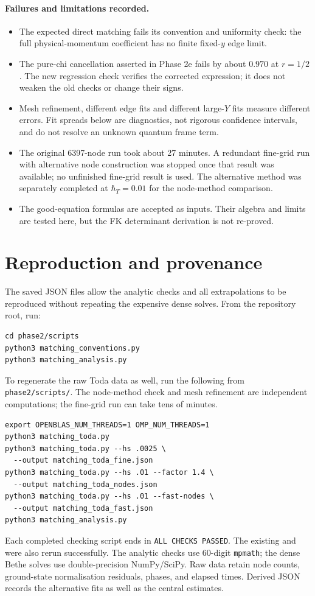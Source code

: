 \documentclass[11pt,a4paper]{article}
\begin{document}
\paragraph{Failures and limitations recorded.}
\begin{itemize}
\item The expected direct matching fails its convention and uniformity check:
the full physical-momentum coefficient has no finite fixed-$y$ edge limit.
\item The pure-chi cancellation asserted in Phase 2e fails by about $0.970$
at $r=1/2$. The new regression check verifies the corrected expression;
it does not weaken the old checks or change their signs.
\item Mesh refinement, different edge fits and different large-$Y$ fits
measure different errors. Fit spreads below are diagnostics, not rigorous
confidence intervals, and do not resolve an unknown quantum frame term.
\item The original 6397-node run took about 27 minutes. A redundant fine-grid
run with alternative node construction was stopped once that result was
available; no unfinished fine-grid result is used. The alternative method
was separately completed at $\hbar_T=0.01$ for the node-method comparison.
\item The good-equation formulas are accepted as inputs. Their algebra and
limits are tested here, but the FK determinant derivation is not re-proved.
\end{itemize}

\clearpage
\section*{Reproduction and provenance}
The saved JSON files allow the analytic checks and all extrapolations to be
reproduced without repeating the expensive dense solves. From the repository
root, run:
\begin{verbatim}
cd phase2/scripts
python3 matching_conventions.py
python3 matching_analysis.py
\end{verbatim}
To regenerate the raw Toda data as well, run the following from
\texttt{phase2/scripts/}. The node-method check and mesh refinement are
independent computations; the fine-grid run can take tens of minutes.
\begin{verbatim}
export OPENBLAS_NUM_THREADS=1 OMP_NUM_THREADS=1
python3 matching_toda.py
python3 matching_toda.py --hs .0025 \
  --output matching_toda_fine.json
python3 matching_toda.py --hs .01 --factor 1.4 \
  --output matching_toda_nodes.json
python3 matching_toda.py --hs .01 --fast-nodes \
  --output matching_toda_fast.json
python3 matching_analysis.py
\end{verbatim}
Each completed checking script ends in \texttt{ALL CHECKS PASSED}.
The existing  and
 were also rerun successfully.
The analytic checks use 60-digit \texttt{mpmath}; the dense Bethe solves use
double-precision NumPy/SciPy. Raw data retain node counts, ground-state
normalisation residuals, phases, and elapsed times. Derived JSON records the
alternative fits as well as the central estimates.
\end{document}
